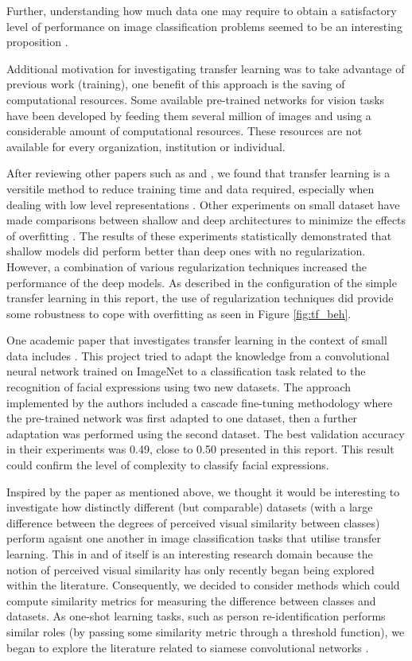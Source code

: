 \documentclass{article}
\begin{document}
Further, understanding how much data one may require to obtain a satisfactory level of performance on image classification problems seemed to be an interesting proposition \cite{howMuchData}. 

Additional motivation for investigating transfer learning was to take advantage of previous work (training), one benefit of this approach is the saving of computational resources. Some available pre-trained networks for vision tasks have been developed by feeding them several million of images and using a considerable amount of computational resources. These resources are not available for every organization, institution or individual.

After reviewing other papers such as \cite{NIPS2014_5347} and \cite{oquab2014learning}, we found that transfer learning is a versitile method to reduce training time and data required, especially when dealing with low level representations \cite{NIPS2014_5347}. Other experiments on small dataset have made comparisons between shallow and deep architectures to minimize the effects of overfitting \citep{pasupa2016comparison}. The results of these experiments statistically demonstrated that shallow models did perform better than deep ones with no regularization. However, a combination of various regularization techniques increased the performance of the deep models. As described in the configuration of the simple transfer learning in this report, the use of regularization techniques did provide some robustness to cope with overfitting as seen in Figure \ref{fig:tf_beh}.

One academic paper that investigates transfer learning in the context of small data includes \citep{ng2015deep}. This project tried to adapt the knowledge from a convolutional neural network trained on ImageNet to a classification task related to the recognition of facial expressions using two new datasets. The approach implemented by the authors included a cascade fine-tuning methodology where the pre-trained network was first adapted to one dataset, then a further adaptation was performed using the second dataset. The best validation accuracy in their experiments was 0.49, close to 0.50 presented in this report. This result could confirm the level of complexity to classify facial expressions.

Inspired by the paper as mentioned above, we thought it would be interesting to investigate how distinctly different (but comparable) datasets (with a large difference between the degrees of perceived visual similarity between classes) perform agaisnt one another in image classification tasks that utilise transfer learning. This in and of itself is an interesting research domain because the notion of perceived visual similarity has only recently began being explored within the literature. Consequently, we decided to consider methods which could compute similarity metrics for measuring the difference between classes and datasets. As one-shot learning tasks, such as person re-identification \cite{ahmed2015improved} performs similar roles (by passing some similarity metric through a threshold function), we began to explore the literature related to siamese convolutional networks \cite{koch}.
\end{document}
